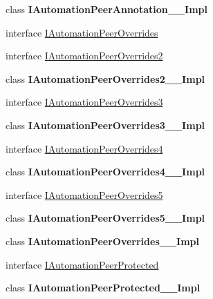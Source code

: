\begin{DoxyCompactItemize}
\item 
class {\bfseries I\+Automation\+Peer\+Annotation\+\_\+\+\_\+\+Impl}
\item 
interface \hyperlink{interface_windows_1_1_u_i_1_1_xaml_1_1_automation_1_1_peers_1_1_i_automation_peer_overrides}{I\+Automation\+Peer\+Overrides}
\item 
interface \hyperlink{interface_windows_1_1_u_i_1_1_xaml_1_1_automation_1_1_peers_1_1_i_automation_peer_overrides2}{I\+Automation\+Peer\+Overrides2}
\item 
class {\bfseries I\+Automation\+Peer\+Overrides2\+\_\+\+\_\+\+Impl}
\item 
interface \hyperlink{interface_windows_1_1_u_i_1_1_xaml_1_1_automation_1_1_peers_1_1_i_automation_peer_overrides3}{I\+Automation\+Peer\+Overrides3}
\item 
class {\bfseries I\+Automation\+Peer\+Overrides3\+\_\+\+\_\+\+Impl}
\item 
interface \hyperlink{interface_windows_1_1_u_i_1_1_xaml_1_1_automation_1_1_peers_1_1_i_automation_peer_overrides4}{I\+Automation\+Peer\+Overrides4}
\item 
class {\bfseries I\+Automation\+Peer\+Overrides4\+\_\+\+\_\+\+Impl}
\item 
interface \hyperlink{interface_windows_1_1_u_i_1_1_xaml_1_1_automation_1_1_peers_1_1_i_automation_peer_overrides5}{I\+Automation\+Peer\+Overrides5}
\item 
class {\bfseries I\+Automation\+Peer\+Overrides5\+\_\+\+\_\+\+Impl}
\item 
class {\bfseries I\+Automation\+Peer\+Overrides\+\_\+\+\_\+\+Impl}
\item 
interface \hyperlink{interface_windows_1_1_u_i_1_1_xaml_1_1_automation_1_1_peers_1_1_i_automation_peer_protected}{I\+Automation\+Peer\+Protected}
\item 
class {\bfseries I\+Automation\+Peer\+Protected\+\_\+\+\_\+\+Impl}
\end{DoxyCompactItemize}
